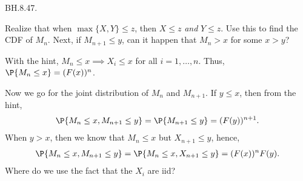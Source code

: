 
\setcounter{theorem}{46}
\begin{exercise} BH.8.47.
\begin{hint}
Realize that when $\max\{X, Y\} \leq z$, then $X\leq z$ \emph{and} $Y\leq z$. Use this to find the CDF of $M_{n}$. Next, if $M_{n+1}\leq y$, can it happen that $M_{n}> x$ for some $x>y$?
\end{hint}
\begin{solution}
With the hint, $M_{n}\leq x \implies X_{i}\leq x$ for all $i=1,\ldots, n$. Thus, $\P{M_n\leq x} = (F(x))^{n}$.

Now we go for the joint distribution of $M_{n}$ and $M_{n+1}$. If $y\leq x$, then from the hint,
\begin{align*}
\P{M_n\leq x, M_{n+1}\leq y} = \P{M_{n+1}\leq y} = (F(y))^{n+1}.
\end{align*}
When $y>x$, then we know that $M_{n}\leq x$ but $X_{n+1}\leq y$, hence,
\begin{align*}
\P{M_n\leq x, M_{n+1}\leq y} = \P{M_{n}\leq x, X_{n+1}\leq y} = (F(x))^{n} F(y).
\end{align*}
Where do we use the fact that the $X_i$ are iid?
\end{solution}
\end{exercise}

